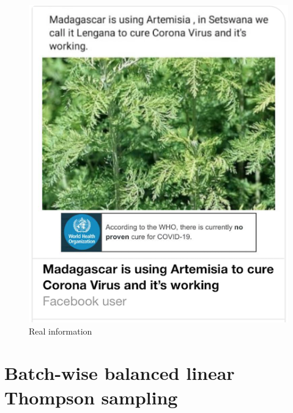 \documentclass[letterpaper, 12pt, parskip=full,]{scrartcl}
\begin{document}
\begin{figure}[htb]
\begin{minipage}{0.45\textwidth}
        \includegraphics[width=\textwidth]{figures/treat_realinfo.png} 
        \caption*{Real information}
    \end{minipage}
\end{figure}

\FloatBarrier
\section{Batch-wise balanced linear Thompson sampling}\label{appendix:agent}

\end{document}
